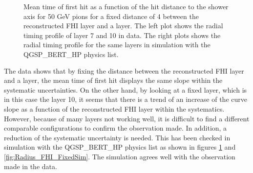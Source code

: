 \begin{figure}[htbp!]
\begin{subfigure}[t]{0.5\textwidth}
		\caption{}\label{fig:Radius_FHISim1}
	\end{subfigure}
	\caption{Mean time of first hit as a function of the hit distance to the shower axis for 50 GeV pions for a fixed distance of 4 between the reconstructed FHI layer and a layer. The left plot shows the radial timing profile of layer 7 and 10 in data. The right plots shows the radial timing profile for the same layers in simulation with the QGSP\_BERT\_HP physics list.}
	\label{fig:Radius_FHIAll}
\end{figure}

The data shows that by fixing the distance between the reconstructed FHI layer and a layer, the mean time of first hit displays the same slope within the systematic uncertainties. On the other hand, by looking at a fixed layer, which is in this case the layer 10, it seems that there is a trend of an increase of the curve slope as a function of the reconstructed FHI layer within the systematics. However, because of many layers not working well, it is difficult to find a different comparable configurations to confirm the observation made. In addition, a reduction of the systematic uncertainty is needed. This has been checked in simulation with the QGSP\_BERT\_HP physics list as shown in figures \ref{fig:Radius_FHISim1} and \ref{fig:Radius_FHI_FixedSim}. The simulation agrees well with the observation made in the data.

